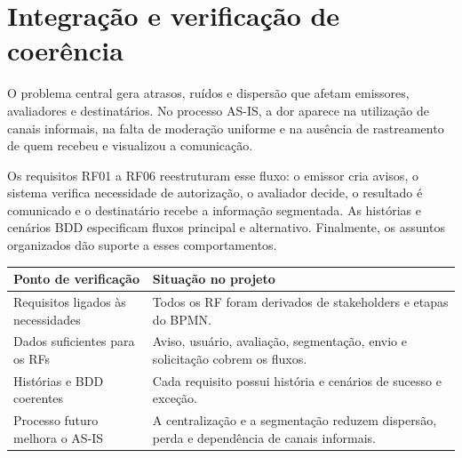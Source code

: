 \section{Integração e verificação de coerência}
O problema central gera atrasos, ruídos e dispersão que afetam emissores, avaliadores e destinatários. No processo AS-IS, a dor aparece na utilização de canais informais, na falta de moderação uniforme e na ausência de rastreamento de quem recebeu e visualizou a comunicação.

Os requisitos RF01 a RF06 reestruturam esse fluxo: o emissor cria avisos, o sistema verifica necessidade de autorização, o avaliador decide, o resultado é comunicado e o destinatário recebe a informação segmentada. As histórias e cenários BDD especificam fluxos principal e alternativo. Finalmente, os assuntos organizados dão suporte a esses comportamentos.

\begin{table}[!ht]\centering\small\renewcommand{\arraystretch}{1.45}
\begin{tabularx}{\linewidth}{|>{\raggedright\arraybackslash}X|>{\raggedright\arraybackslash}X|}
\hline
\textbf{Ponto de verificação} & \textbf{Situação no projeto} \\
\hline
Requisitos ligados às necessidades & Todos os RF foram derivados de stakeholders e etapas do BPMN. \\
\hline
Dados suficientes para os RFs & Aviso, usuário, avaliação, segmentação, envio e solicitação cobrem os fluxos. \\
\hline
Histórias e BDD coerentes & Cada requisito possui história e cenários de sucesso e exceção. \\
\hline
Processo futuro melhora o AS-IS & A centralização e a segmentação reduzem dispersão, perda e dependência de canais informais. \\
\hline
\end{tabularx}
\end{table}
